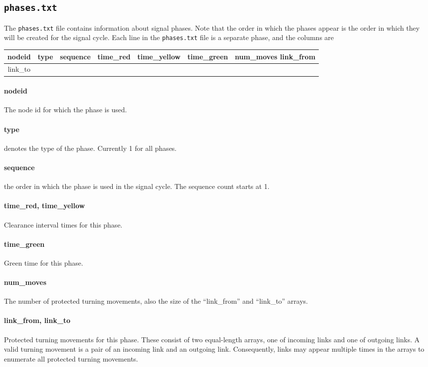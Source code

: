 \subsection{\texttt{phases.txt}}
The \texttt{phases.txt} file contains information about signal phases. Note that the order in which the phases appear is the order in which they will be created for the signal cycle. Each line in the \texttt{phases.txt} file is a separate phase, and the columns are
\begin{center}
\begin{tabular}{ccccccc}
\hline
nodeid & type & sequence & time\_red & time\_yellow & time\_green & num\_moves	link\_from \\ \hline \hline
link\_to\\\hline
\end{tabular}
\end{center}
\paragraph*{nodeid} The node id for which the phase is used.
\paragraph*{type} denotes the type of the phase. Currently 1 for all phases.
\paragraph*{sequence} the order in which the phase is used in the signal cycle. The sequence count starts at 1.
\paragraph*{time\_red, time\_yellow} Clearance interval times for this phase.
\paragraph*{time\_green} Green time for this phase.
\paragraph*{num\_moves} The number of protected turning movements, also the size of the ``link\_from'' and ``link\_to'' arrays.
\paragraph*{link\_from, link\_to} Protected turning movements for this phase. These consist of two equal-length arrays, one of incoming links and one of outgoing links. A valid turning movement is a pair of an incoming link and an outgoing link. Consequently, links may appear multiple times in the arrays to enumerate all protected turning movements.


